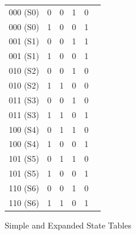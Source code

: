 \documentclass[12pt]{article}
\begin{document}
\begin{figure}[H]
{{\begin{tabular}{|c|c|c|c|c|c|}
				\hline
				000 (S0)             & 0              & 0                & 1                & 0                \\
				000 (S0)             & 1              & 0                & 0                & 1                \\
				\hline
				001 (S1)             & 0              & 0                & 1                & 1                \\
				001 (S1)             & 1              & 0                & 0                & 1                \\
				\hline
				010 (S2)             & 0              & 0                & 1                & 0                \\
				010 (S2)             & 1              & 1                & 0                & 0                \\
				\hline
				011 (S3)             & 0              & 0                & 1                & 0                \\
				011 (S3)             & 1              & 1                & 0                & 1                \\
				\hline
				100 (S4)             & 0              & 1                & 1                & 0                \\
				100 (S4)             & 1              & 0                & 0                & 1                \\
				\hline
				101 (S5)             & 0              & 1                & 1                & 0                \\
				101 (S5)             & 1              & 0                & 0                & 1                \\
				\hline
				110 (S6)             & 0              & 0                & 1                & 0                \\
				110 (S6)             & 1              & 1                & 0                & 1                \\
				\hline
			\end{tabular}
		}
	}
	\caption{Simple and Expanded State Tables}
\end{figure}
\end{document}
